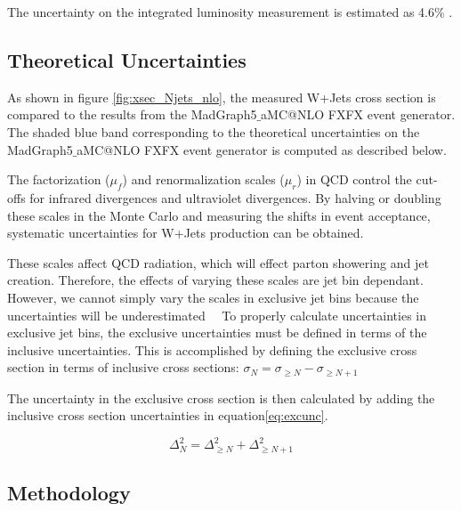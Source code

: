 \documentclass[oneside, letterpaper, oldfontcommands]{memoir}
\begin{document}
\qquad The uncertainty on the integrated luminosity measurement is estimated as 4.6\% \cite{CMS-PAS-LUM-15-001}.

\subsection{Theoretical Uncertainties}
\qquad As shown in figure \ref{fig:xsec_Njets_nlo}, the measured W+Jets cross section is compared to the results from the {\sc MadGraph5$\_$aMC@NLO} FXFX event generator. The shaded blue band corresponding to the theoretical uncertainties on the {\sc MadGraph5$\_$aMC@NLO} FXFX event generator is computed as described below.

\qquad The factorization ($\mu_{f}$) and renormalization scales ($\mu_{r}$) in QCD control the cut-offs for infrared divergences and ultraviolet divergences. By halving or doubling these scales in the Monte Carlo and measuring the shifts in event acceptance, systematic uncertainties for W+Jets production can be obtained.

\qquad These scales affect QCD radiation, which will effect parton showering and jet creation. Therefore, the effects of varying these scales are jet bin dependant. However, we cannot simply vary the scales in exclusive jet bins because the uncertainties will be underestimated~\cite{Gangal:2013nxa}~\cite{Stewart:2011cf} To properly calculate uncertainties in exclusive jet bins, the exclusive uncertainties must be defined in terms of the inclusive uncertainties.
This is accomplished by defining the exclusive cross section in terms of inclusive cross sections: $\sigma_{N} = \sigma_{\geq N} - \sigma_{\geq N+1}$

\qquad The uncertainty in the exclusive cross section is then calculated by adding the inclusive cross section uncertainties in equation\eqref{eq:excunc}.

\begin{equation}\label{eq:excunc}
\Delta_{N}^2 = \Delta_{\geq N}^2 + \Delta_{\geq N+1}^2
\end{equation}

\subsection{Methodology}
\label{application}
\end{document}
